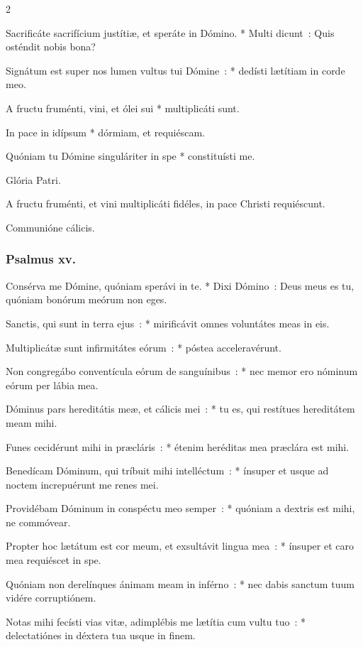 \documentclass[9pt,twoside]{extarticle}
\begin{document}
\begin{multicols}{2}
{{Sacrificáte sacrifícium justítiæ, et speráte in Dómino. * Multi dicunt~: Quis osténdit nobis bona?

Signátum est super nos lumen vultus tui Dómine~: * dedísti lætítiam in corde meo.

A fructu fruménti, vini, et ólei sui * multiplicáti sunt.

In pace in idípsum * dórmiam, et requiéscam.

Quóniam tu Dómine singuláriter in spe * constituísti me.

Glória Patri.

\begin{tightlist}{}
\item {} A fructu fruménti, et vini multiplicáti fidéles, in pace Christi requiéscunt.
\item {} Communióne cálicis.
\end{tightlist}
\subsubsection*{\center Psalmus xv.}
\lettrine{C}onsérva me Dómine, quóniam sperávi in te. * Dixi Dómino~: Deus meus es tu, quóniam bonórum meórum non eges.

Sanctis, qui sunt in terra ejus~: * mirificávit omnes voluntátes meas in eis.

Multiplicátæ sunt infirmitátes eórum~: * póstea acceleravérunt.

Non congregábo conventícula eórum de sanguínibus~: * nec memor ero nóminum eórum per lábia mea.

Dóminus pars hereditátis meæ, et cálicis mei~: * tu es, qui restítues hereditátem meam mihi.

Funes cecidérunt mihi in præcláris~: * étenim heréditas mea præclára est mihi.

Benedícam Dóminum, qui tríbuit mihi intelléctum~: * ínsuper et usque ad noctem increpuérunt me renes mei.

Providébam Dóminum in conspéctu meo semper~: * quóniam a dextris est mihi, ne commóvear.

Propter hoc lætátum est cor meum, et exsultávit lingua mea~: * ínsuper et caro mea requiéscet in spe.

Quóniam non derelínques ánimam meam in inférno~: * nec dabis sanctum tuum vidére corruptiónem.

Notas mihi fecísti vias vitæ, adimplébis me lætítia cum vultu tuo~: * delectatiónes in déxtera tua usque in finem.

}}
\end{multicols}
\end{document}
